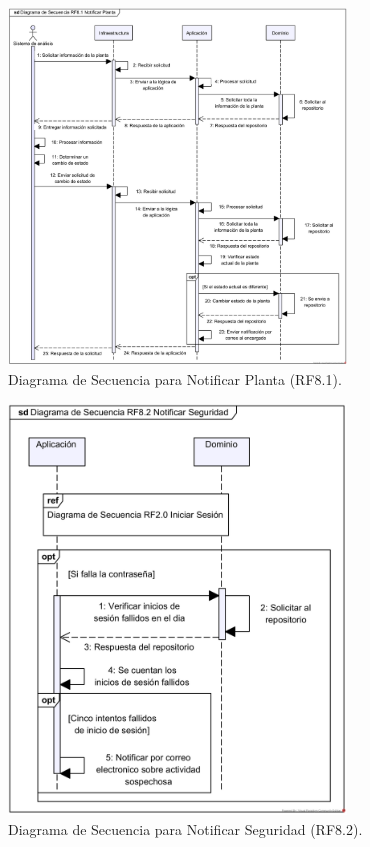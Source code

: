 \begin{figure}[H]
	\centering
	\caption{Diagrama de Secuencia para Notificar Planta (RF8.1).}
 \includegraphics[width=0.8\textwidth]{UML/Secuencia/Diagrama de Secuencia RF8.1 Notificar Planta.png}
\end{figure}


\begin{figure}[H]
	\centering
	\caption{Diagrama de Secuencia para Notificar Seguridad (RF8.2).}
 \includegraphics[width=0.8\textwidth]{UML/Secuencia/Diagrama de Secuencia RF8.2 Notificar Seguridad.png}
\end{figure}


